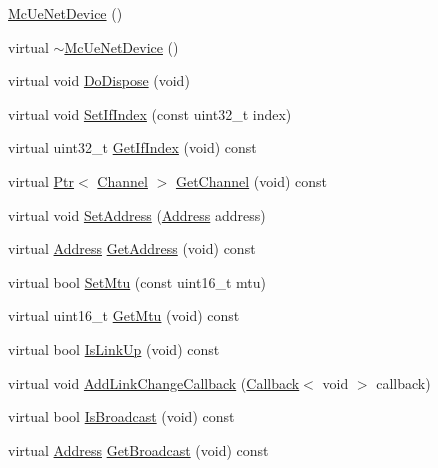 \begin{DoxyCompactItemize}
\item 
\hyperlink{classns3_1_1McUeNetDevice_af05e1a691f6887c97e60095cfd1406ab}{Mc\+Ue\+Net\+Device} ()
\item 
virtual \hyperlink{classns3_1_1McUeNetDevice_a6c31df8aaa51a40a0703a2269ad6e962}{$\sim$\+Mc\+Ue\+Net\+Device} ()
\item 
virtual void \hyperlink{classns3_1_1McUeNetDevice_a339cac8af1acfa42d6807c3f07eb5a06}{Do\+Dispose} (void)
\item 
virtual void \hyperlink{classns3_1_1McUeNetDevice_a0cf4fd5763775926a32ae73b1237079c}{Set\+If\+Index} (const uint32\+\_\+t index)
\item 
virtual uint32\+\_\+t \hyperlink{classns3_1_1McUeNetDevice_a6264c5762bb88fa49c2a3bdabdee678e}{Get\+If\+Index} (void) const 
\item 
virtual \hyperlink{classns3_1_1Ptr}{Ptr}$<$ \hyperlink{classns3_1_1Channel}{Channel} $>$ \hyperlink{classns3_1_1McUeNetDevice_a8a63ad325ae6be2be0105d85bc2429f3}{Get\+Channel} (void) const 
\item 
virtual void \hyperlink{classns3_1_1McUeNetDevice_ab34e76659bc23b3a2c01ae8799490247}{Set\+Address} (\hyperlink{classns3_1_1Address}{Address} address)
\item 
virtual \hyperlink{classns3_1_1Address}{Address} \hyperlink{classns3_1_1McUeNetDevice_a50420b9b8d6f3b6aa7985f8464499a01}{Get\+Address} (void) const 
\item 
virtual bool \hyperlink{classns3_1_1McUeNetDevice_a5e96ae8adedd8cbcfa150c00fb2f66cd}{Set\+Mtu} (const uint16\+\_\+t mtu)
\item 
virtual uint16\+\_\+t \hyperlink{classns3_1_1McUeNetDevice_a1187ad68b3cf7238e34d068e23c941ce}{Get\+Mtu} (void) const 
\item 
virtual bool \hyperlink{classns3_1_1McUeNetDevice_a2394d8fa8af0a8b549f4fdc81acdce99}{Is\+Link\+Up} (void) const 
\item 
virtual void \hyperlink{classns3_1_1McUeNetDevice_aa7e4e11d07374b3a4c57e751a5d49897}{Add\+Link\+Change\+Callback} (\hyperlink{classns3_1_1Callback}{Callback}$<$ void $>$ callback)
\item 
virtual bool \hyperlink{classns3_1_1McUeNetDevice_aa00c773a537f515389699907efac4c87}{Is\+Broadcast} (void) const 
\item 
virtual \hyperlink{classns3_1_1Address}{Address} \hyperlink{classns3_1_1McUeNetDevice_a094094d117aeb53e7fcefd249aaa9d25}{Get\+Broadcast} (void) const 
\item 

\end{DoxyCompactItemize}
